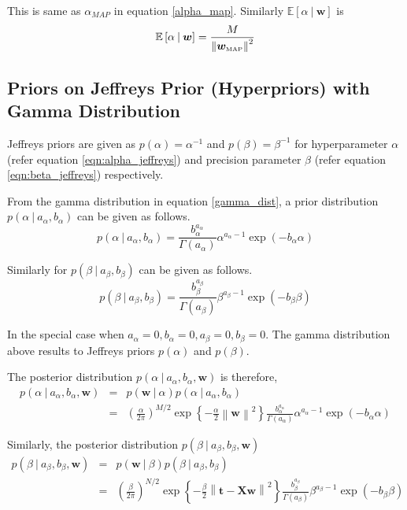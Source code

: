 \documentclass[11pt]{article}
\newcommand{\mean}[1]{\mathbb{E}\left[#1\right]}
\newcommand{\map}[1]{{#1}_{\text{\tiny MAP}}}
\newcommand\given[1][]{\:#1\vert\:}
\newcommand{\norm}[1]{\left\lVert#1\right\rVert}
\begin{document}
This is same as $\alpha_{MAP}$ in equation \ref{alpha_map}. Similarly $\mean{\alpha \given \bm{w}}$ is
\begin{equation}
    \mean{\alpha \given \bm{w}} = \frac{M}{\norm{\map{\bm{w}}}^2}
\end{equation}

\subsection{Priors on Jeffreys Prior (Hyperpriors) with Gamma Distribution}

Jeffreys priors are given as $p(\alpha) = \alpha^{-1}$ and $p(\beta) = \beta^{-1}$ for hyperparameter $\alpha$ (refer equation \ref{eqn:alpha_jeffreys}) and precision parameter $\beta$ (refer equation \ref{eqn:beta_jeffreys}) respectively. 

From the gamma distribution in equation \ref{gamma_dist}, a prior distribution $p(\alpha \given a_{\alpha}, b_{\alpha})$ can be given as follows.
\begin{equation} \label{gamma_alpha}
    p(\alpha \given a_{\alpha}, b_{\alpha}) =  \frac{b_{\alpha}^{a_{\alpha}}}{\Gamma(a_{\alpha})}\alpha^{a_{\alpha}-1}\exp{(-b_{\alpha}\alpha)}
\end{equation}

Similarly for $p(\beta \given a_{\beta}, b_{\beta})$ can be given as follows.
\begin{equation}\label{gamma_beta}
    p(\beta \given a_{\beta}, b_{\beta}) =  \frac{b_{\beta}^{a_{\beta}}}{\Gamma(a_{\beta})}\beta^{a_{\beta}-1}\exp{(-b_{\beta}\beta)}
\end{equation}

In the special case when $a_{\alpha}=0, b_{\alpha}=0, a_{\beta} = 0, b_{\beta}=0$. The gamma distribution above results to Jeffreys priors $p(\alpha)$ and $p(\beta)$. 

The posterior distribution $p(\alpha \given a_{\alpha}, b_{\alpha}, \bm{w})$ is therefore,
\begin{eqnarray} \label{eqn:posterior_gamma_alpha}
    p(\alpha \given a_{\alpha}, b_{\alpha}, \bm{w}) 
    &=& p(\bm{w} \given \alpha)p(\alpha \given a_{\alpha}, b_{\alpha})\\
    &=& \left( \frac{\alpha}{2\pi}\right)^{M/2} \exp{\left\{ -\frac{\alpha}{2}\norm{\bm{w}}^2\right\}}\frac{b_{\alpha}^{a_{\alpha}}}{\Gamma(a_{\alpha})}\alpha^{a_{\alpha}-1}\exp{(-b_{\alpha}\alpha)}
\end{eqnarray}

Similarly, the posterior distribution $p(\beta \given a_{\beta}, b_{\beta}, \bm{w})$
\begin{eqnarray}\label{eqn:posterior_gamma_beta}
    p(\beta \given a_{\beta}, b_{\beta}, \bm{w}) 
    &=& p(\bm{w} \given \beta)p(\beta \given a_{\beta}, b_{\beta})\\
    &=& \left( \frac{\beta}{2\pi}\right)^{N/2}\exp\left\{-\frac{\beta}{2}\norm{\bm{t}-\bm{X}\bm{w}}^2 \right\}\frac{b_{\beta}^{a_{\beta}}}{\Gamma(a_{\beta})}\beta^{a_{\beta}-1}\exp{(-b_{\beta}\beta)}
\end{eqnarray}
\end{document}
